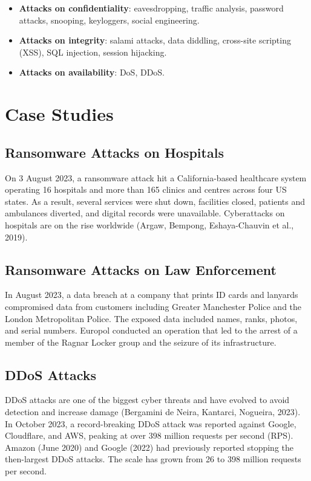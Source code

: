 \documentclass[11pt,a4paper,openany]{report}
\theoremstyle{definition}
\theoremstyle{plain}
\theoremstyle{remark}
\begin{document}
\begin{itemize}
    \item \textbf{Attacks on confidentiality}: eavesdropping, traffic analysis, password attacks, snooping, keyloggers, social engineering.
    \item \textbf{Attacks on integrity}: salami attacks, data diddling, cross-site scripting (XSS), SQL injection, session hijacking.
    \item \textbf{Attacks on availability}: DoS, DDoS.
\end{itemize}


\section{Case Studies}

\subsection{Ransomware Attacks on Hospitals}

On 3 August 2023, a ransomware attack hit a California-based healthcare system operating 16 hospitals and more than 165 clinics and centres across four US states. As a result, several services were shut down, facilities closed, patients and ambulances diverted, and digital records were unavailable. Cyberattacks on hospitals are on the rise worldwide (Argaw, Bempong, Eshaya-Chauvin et al., 2019).

\subsection{Ransomware Attacks on Law Enforcement}

In August 2023, a data breach at a company that prints ID cards and lanyards compromised data from customers including Greater Manchester Police and the London Metropolitan Police. The exposed data included names, ranks, photos, and serial numbers. Europol conducted an operation that led to the arrest of a member of the Ragnar Locker group and the seizure of its infrastructure.

\subsection{DDoS Attacks}

DDoS attacks are one of the biggest cyber threats and have evolved to avoid detection and increase damage (Bergamini de Neira, Kantarci, Nogueira, 2023). In October 2023, a record-breaking DDoS attack was reported against Google, Cloudflare, and AWS, peaking at over 398 million requests per second (RPS). Amazon (June 2020) and Google (2022) had previously reported stopping the then-largest DDoS attacks. The scale has grown from 26 to 398 million requests per second.
\end{document}
